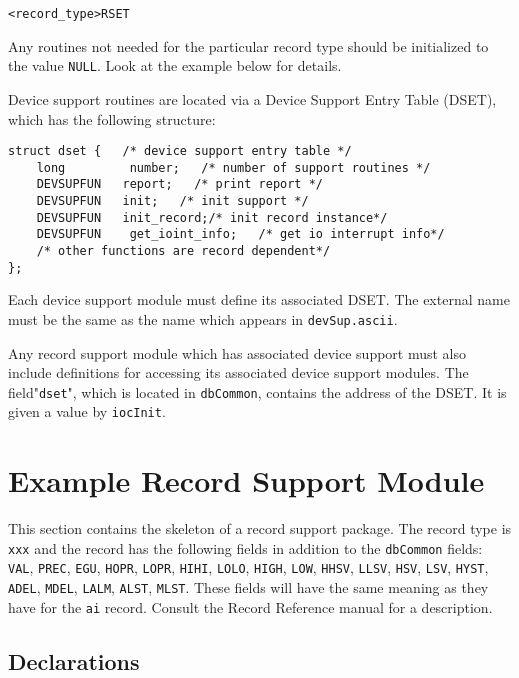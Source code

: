 \begin{verbatim}
<record_type>RSET
\end{verbatim}

Any routines not needed for the particular record type should be initialized to the value \verb|NULL|. Look at the example below 
for details.

Device support routines are located via a Device Support Entry Table (DSET), which has the following structure:

\begin{verbatim}
struct dset {   /* device support entry table */
    long         number;   /* number of support routines */
    DEVSUPFUN   report;   /* print report */
    DEVSUPFUN   init;   /* init support */
    DEVSUPFUN   init_record;/* init record instance*/
    DEVSUPFUN    get_ioint_info;   /* get io interrupt info*/
    /* other functions are record dependent*/
};
\end{verbatim}

Each device support module must define its associated DSET. The external name must be the same as the name which 
appears in \verb|devSup.ascii|.

Any record support module which has associated device support must also include definitions for accessing its associated 
device support modules. The field"\verb|dset|", which is located in \verb|dbCommon|, contains the address of the DSET. It is given a 
value by \verb|iocInit|.

\section{Example Record Support Module}

This section contains the skeleton of a record support package. The record type is \verb|xxx| and the record has the following 
fields in addition to the \verb|dbCommon| fields: \verb|VAL|, \verb|PREC|, \verb|EGU|, \verb|HOPR|, \verb|LOPR|, \verb|HIHI|, \verb|LOLO|, \verb|HIGH|, \verb|LOW|, \verb|HHSV|, \verb|LLSV|, \verb|HSV|, 
\verb|LSV|, \verb|HYST|, \verb|ADEL|, \verb|MDEL|, \verb|LALM|, \verb|ALST|, \verb|MLST|. These fields will have the same meaning as they have for the \verb|ai| record. 
Consult the Record Reference manual for a description. 

\subsection{Declarations}

